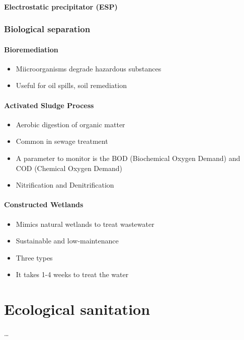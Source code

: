 \documentclass{article}
\begin{document}
\subsection{Electrostatic precipitator (ESP)}

\newpage
\section{Biological separation}
\subsection{Bioremediation}
\begin{itemize}
    \item Miicroorganisms degrade hazardous substances
    \item Useful for oil spills, soil remediation
\end{itemize}

\subsection{Activated Sludge Process}
\begin{itemize}
    \item Aerobic digestion of organic matter
    \item Common in sewage treatment
    \item A parameter to monitor is the BOD (Biochemical Oxygen Demand) and COD (Chemical Oxygen Demand)
    \item Nitrification and Denitrification
\end{itemize}

\subsection{Constructed Wetlands}
\begin{itemize}
    \item Mimics natural wetlands to treat wastewater
    \item Sustainable and low-maintenance
    \item Three types
    \item It takes 1-4 weeks to treat the water
\end{itemize}

\part{Ecological sanitation}
\dots
\end{document}
